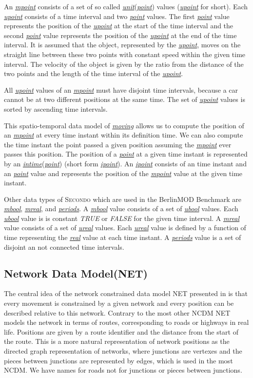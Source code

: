 \documentclass[a4paper]{article}
\newcommand{\secondo}{\textsc{Secondo}}
\newcommand{\bmodb} {BerlinMOD Benchmark}
\newcommand{\dt}[1]{\textsl{\underline{#1}}}
\newcommand{\true}{\textsl{TRUE}}
\newcommand{\false}{\textsl{FALSE}}
\begin{document}
An \dt{mpoint} consists of a set of so called \dt{unit}(\dt{point}) values
(\dt{upoint} for short).
Each \dt{upoint} consists of a time interval and two \dt{point} values. The first
\dt{point} value represents the position of the \dt{upoint} at the start of the
time interval and the second \dt{point} value represents the position of the
\dt{upoint} at the end of the time interval. It is assumed that the object,
represented by the \dt{upoint}, moves on the straight line between these two
points with constant
speed within the given time interval. The velocity of the object is given by the
ratio from the distance of the two points and the length of the time interval of
the \dt{upoint}.

All \dt{upoint} values of an \dt{mpoint} must have disjoint time intervals,
because a car cannot be at two different positions at the same time.
The set of \dt{upoint} values is sorted by ascending time intervals.

This spatio-temporal data model of \dt{moving} allows us to compute the position
of an \dt{mpoint} at every time instant within its definition time.
We can also compute the time instant the point passed a
given position assuming the \dt{mpoint} ever passes this position. The position of a
\dt{point} at a given time instant is represented by an \dt{intime}(\dt{point})
(short form \dt{ipoint}). An \dt{ipoint} consists of an time instant and an
\dt{point}
value and represents the position of the \dt{mpoint} value at the given time
instant.

Other data types of \secondo{} which are used in the \bmodb{} are \dt{mbool},
\dt{mreal}, and \dt{periods}. A \dt{mbool} value consists of a set of \dt{ubool}
values. Each \dt{ubool} value is is constant \true{} or \false{} for the given
time interval. A \dt{mreal} value consists of a set of \dt{ureal} values. Each
\dt{ureal} value is defined by a function of time representing the \dt{real}
value at each time instant. A \dt{periods} value is a set of disjoint an not
connected time intervals.
\subsection{Network Data Model(NET)}
\label{sec:netdatamod}
The central idea of the network constrained data model NET presented in
\cite{NetworkGueting} is that
every movement is constrained by a given network and every position can be described
relative to this network. Contrary to the most other NCDM NET models the network
in terms of routes, corresponding to roads or highways in real life. Positions
are given by a route identifier and the distance from the start of the route.
This is a more natural representation of network positions as the directed graph
representation of networks, where junctions are vertexes and the pieces between
junctions are represented by edges, which is used in the most NCDM. We have names
for roads not for junctions or pieces between junctions.
\end{document}
